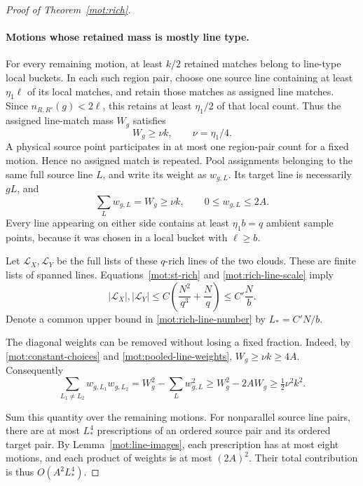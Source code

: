 \begin{proof}[Proof of Theorem~\ref{mot:rich}]
\paragraph{Motions whose retained mass is mostly line type.}
For every remaining motion, at least \(k/2\) retained matches
belong to line-type local buckets.  In each such region pair,
choose one source line containing at least \(\eta_1\ell\) of
its local matches, and retain those matches as assigned line
matches.  Since \(n_{R,R'}(g)<2\ell\), this retains at least
\(\eta_1/2\) of that local count.  Thus the assigned line-match
mass \(W_g\) satisfies
\[
 W_g\ge\nu k,\qquad \nu=\eta_1/4.
\]
A physical source point participates in at most one region-pair
count for a fixed motion.  Hence no assigned match is repeated.
Pool assignments belonging to the same full source line \(L\),
and write its weight as \(w_{g,L}\).  Its target line is necessarily
\(gL\), and
\begin{equation}
\label{mot:pooled-line-weights}
 \sum_Lw_{g,L}=W_g\ge\nu k,
 \qquad 0\le w_{g,L}\le2A.
\end{equation}
Every line appearing on either side contains at least
\(\eta_1b=q\) ambient sample points, because it was chosen in a
local bucket with \(\ell\ge b\).

Let \(\mathcal L_X,\mathcal L_Y\) be the full lists of these
\(q\)-rich lines of the two clouds.  These are finite lists of
spanned lines.  Equations~\eqref{mot:st-rich} and
\eqref{mot:rich-line-scale} imply
\begin{equation}
\label{mot:rich-line-number}
 |\mathcal L_X|,|\mathcal L_Y|
 \le C\left(\frac{N^2}{q^3}+\frac Nq\right)
 \le C'\frac Nb.
\end{equation}
Denote a common upper bound in \eqref{mot:rich-line-number} by
\(L_*=C'N/b\).

The diagonal weights can be removed without losing a fixed
fraction.  Indeed, by \eqref{mot:constant-choices} and
\eqref{mot:pooled-line-weights},
\(W_g\ge\nu k\ge4A\).  Consequently
\begin{equation}
\label{mot:distinct-line-pair-mass}
 \sum_{L_1\ne L_2}w_{g,L_1}w_{g,L_2}
 =W_g^2-\sum_Lw_{g,L}^2
 \ge W_g^2-2AW_g
 \ge\tfrac12\nu^2 k^2.
\end{equation}

Sum this quantity over the remaining motions.  For nonparallel
source line pairs, there are at most \(L_*^4\) prescriptions of
an ordered source pair and its ordered target pair.  By
Lemma~\ref{mot:line-images}, each prescription has at most eight
motions, and each product of weights is at most \((2A)^2\).
Their total contribution is thus \(O(A^2L_*^4)\).


\end{proof}
